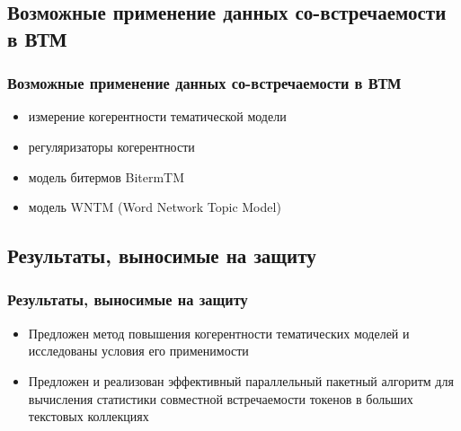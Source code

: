 \documentclass[unicode]{beamer}
\begin{document}
\subsection{Возможные применение данных со-встречаемости в ВТМ}
\begin{frame}

\frametitle{Возможные применение данных со-встречаемости в ВТМ}
\begin{itemize}
    \item измерение когерентности тематической модели
    \item регуляризаторы когерентности
    \item модель битермов BitermTM
    \item модель WNTM (Word Network Topic Model)
\end{itemize}

\end{frame}

\subsection{Результаты, выносимые на защиту}
\begin{frame}
\frametitle{Результаты, выносимые на защиту}
\begin{itemize}
    \item Предложен метод повышения когерентности тематических моделей и исследованы условия его применимости \newline
    \item Предложен и реализован эффективный параллельный пакетный алгоритм для вычисления статистики совместной встречаемости токенов в больших текстовых коллекциях
\end{itemize}
\end{frame}
\end{document}

